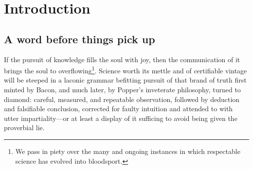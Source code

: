 
\chapter{Introduction}
\label{chp:1}


\section{A word before things pick up}

If the pursuit of knowledge fills the soul with joy, then the
communication of it brings the soul to overflowing\footnote{We pass in
  piety over the many and ongoing instances in which respectable
  science has evolved into bloodsport.}. Science worth its mettle and
of certifiable vintage will be steeped in a laconic grammar befitting
pursuit of that brand of truth first minted by Bacon, and much later,
by Popper's inveterate philosophy, turned to diamond: careful,
measured, and repeatable observation, followed by deduction and
falsifiable conclusion, corrected for faulty intuition and attended to
with utter impartiality---or at least a display of it sufficing to
avoid being given the proverbial lie.

